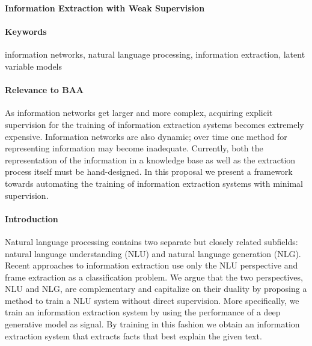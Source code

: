 \documentclass[11pt]{article}
\begin{document}

\begin{center}
\textbf{Information Extraction with Weak Supervision}
\end{center}

\begin{comment}
Spectrum from hard attention => hard segmental => HSMM for generative model, coverage / recall
Should we go into HSMM??? or is hard segmental attention enough

composition function = categorical over two entries of x

structured attention for IE posterior?
\end{comment}

\paragraph{Keywords}
information networks, natural language processing, information extraction,
latent variable models

\paragraph{Relevance to BAA}
As information networks get larger and more complex,
acquiring explicit supervision for the training of information extraction systems
becomes extremely expensive.
Information networks are also dynamic;
over time one method for representing information may become inadequate.
Currently, both the representation of the information in a knowledge base
as well as the extraction process itself must be hand-designed.
In this proposal we present a framework towards automating the
training of information extraction systems with minimal supervision.

\paragraph{Introduction}
Natural language processing contains two separate but
closely related subfields: natural language understanding (NLU) and natural language
generation (NLG).
Recent approaches to information extraction use only the NLU perspective
and frame extraction as a classification problem.
We argue that the two perspectives, NLU and NLG, are complementary
and capitalize on their duality by proposing a method to train a NLU system
without direct supervision.
More specifically, we train an information extraction system by using
the performance of a deep generative model as signal.
By training in this fashion we obtain an information extraction system
that extracts facts that best explain the given text.
\end{document}
